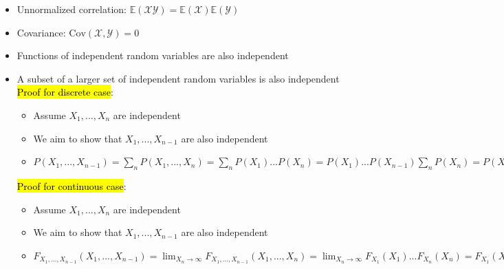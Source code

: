 \begin{itemize}
\begin{itemize}
\begin{itemize}
            $= f_{X_1}(x_1) f_{X_2}(x_2) \ldots f_{X_n}(x_n)$
            \item Direction 2: $F_{X_1, X_2, \ldots, X_n}(x_1, x_2, \ldots, x_n) = \int_{-\infty}^{x_1} \int_{-\infty}^{x_2} \ldots \int_{-\infty}^{x_n} f_{X_1, X_2, \ldots, X_n}(\tilde{x}_1, \tilde{x}_2, \ldots, \tilde{x}_n) \, d\tilde{x}_1 \, d\tilde{x}_2 \ldots d\tilde{x}_n$\\
            $= \int_{-\infty}^{x_1} \int_{-\infty}^{x_2} \ldots \int_{-\infty}^{x_n} f_{X_1}(\tilde{x}_1) f_{X_2}(\tilde{x}_2) \ldots f_{X_n}(\tilde{x}_n) \, d\tilde{x}_1 \, d\tilde{x}_2 \ldots d\tilde{x}_n$\\
            $= \int_{-\infty}^{x_1} f_{X_1}(\tilde{x}_1) \, d\tilde{x}_1 \int_{-\infty}^{x_2} f_{X_2}(\tilde{x}_2) \, d\tilde{x}_2 \ldots \int_{-\infty}^{x_n} f_{X_n}(\tilde{x}_n) \, d\tilde{x}_n$\\
            $= F_{X_1}(x_1) F_{X_2}(x_2) \ldots F_{X_n}(x_n)$
        \end{itemize}
        \item Unnormalized correlation: $\mathbb{E}(\mathcal{X}\mathcal{Y})=\mathbb{E}(\mathcal{X})\mathbb{E}(\mathcal{Y})$
        \item Covariance: $\textrm{Cov}(\mathcal{X},\mathcal{Y})=0$
        \item Functions of independent random variables are also independent
        \item A subset of a larger set of independent random variables is also independent\\
        \hl{Proof for discrete case}:
        \begin{itemize}
            \item Assume $X_1, ..., X_n$ are independent
            \item We aim to show that $X_1, ..., X_{n-1}$ are also independent
            \item $P(X_1, ..., X_{n-1}) = \sum_n P(X_1, ..., X_n) = \sum_n P(X_1)...P(X_n) = P(X_1)...P(X_{n-1}) \sum_n P(X_n) = P(X_1)...P(X_{n-1}) \times 1$
        \end{itemize}
        \hl{Proof for continuous case}:
        \begin{itemize}
            \item Assume $X_1, ..., X_n$ are independent
            \item We aim to show that $X_1, ..., X_{n-1}$ are also independent
            \item $F_{X_1, ..., X_{n-1}}(X_1, ..., X_{n-1}) = \lim_{X_n \to \infty} F_{X_1, ..., X_{n-1}}(X_1, ..., X_n) = \lim_{X_n \to \infty} F_{X_1}(X_1) ... F_{X_n}(X_n) = F_{X_1}(X_1) ... F_{X_{n-1}}(X_{n-1}) \lim_{X_n \to \infty} F_{X_n}(X_n) = F_{X_1}(X_1) ... F_{X_{n-1}}(X_{n-1}) \times 1$

\end{itemize}
\end{itemize}
\end{itemize}
